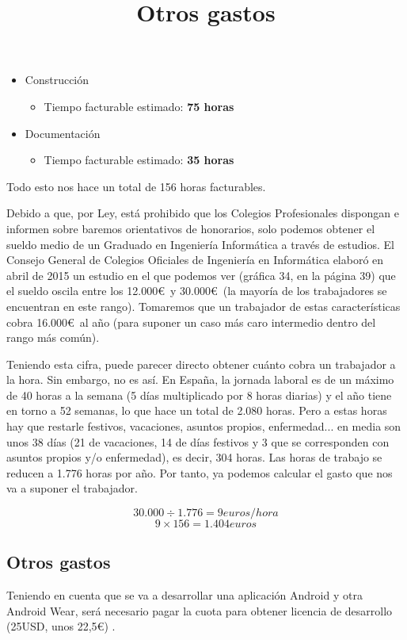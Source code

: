 \begin{itemize}
  \item Construcción
  \begin{itemize}
    \item{Tiempo facturable estimado: \textbf{75 horas}}
  \end{itemize}
\end{itemize}

\begin{itemize}
  \item Documentación
  \begin{itemize}
    \item{Tiempo facturable estimado: \textbf{35 horas}}
  \end{itemize}
\end{itemize}

Todo esto nos hace un total de 156 horas facturables.

Debido a que, por Ley, está prohibido que los Colegios Profesionales dispongan e informen
sobre baremos orientativos de honorarios, solo podemos obtener el sueldo medio de un Graduado
en Ingeniería Informática a través de estudios. El Consejo General de Colegios Oficiales de Ingeniería en Informática
elaboró en abril de 2015 un estudio \cite{estudioSalario} en el que podemos ver (gráfica 34, en la página 39) que el sueldo
oscila entre los 12.000\euro\ y 30.000\euro\ (la mayoría de los trabajadores se encuentran en este rango). Tomaremos que un trabajador
de estas características cobra 16.000\euro\ al año (para suponer un caso más caro intermedio dentro del rango más común).

Teniendo esta cifra, puede parecer directo obtener cuánto cobra un trabajador a la hora. Sin
embargo, no es así. En España, la jornada laboral es de un máximo de 40 horas a la semana (5 días
multiplicado por 8 horas diarias) y el año tiene en torno a 52 semanas, lo que hace un total de 2.080 horas.
Pero a estas horas hay que restarle festivos, vacaciones, asuntos propios, enfermedad... en media
son unos 38 días (21 de vacaciones, 14 de días festivos y 3 que se corresponden con asuntos propios y/o
enfermedad), es decir, 304 horas. Las horas de trabajo se reducen a 1.776 horas por año. Por tanto, ya
podemos calcular el gasto que nos va a suponer el trabajador.


\[
  30.000 \div 1.776 = 9 euros/hora
\]
\[
  9 \times 156 = 1.404 euros
\]

\subsection{Otros gastos}
\title{Otros gastos}
Teniendo en cuenta que se va a desarrollar una aplicación Android y otra Android Wear,
será necesario pagar la cuota para obtener licencia de desarrollo (25USD, unos 22,5\euro) \cite{desarrollaAndroid}.



